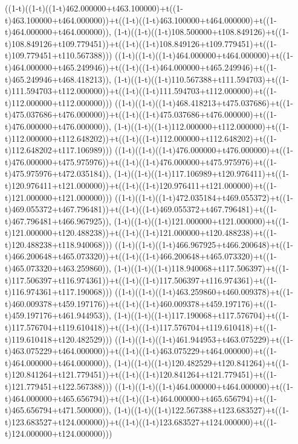 ((1-t)((1-t)((1-t)462.000000+t463.100000)+t((1-t)463.100000+t464.000000))+t((1-t)((1-t)463.100000+t464.000000)+t((1-t)464.000000+t464.000000)),                                     (1-t)((1-t)((1-t)108.500000+t108.849126)+t((1-t)108.849126+t109.779451))+t((1-t)((1-t)108.849126+t109.779451)+t((1-t)109.779451+t110.567388)))
((1-t)((1-t)((1-t)464.000000+t464.000000)+t((1-t)464.000000+t465.249946))+t((1-t)((1-t)464.000000+t465.249946)+t((1-t)465.249946+t468.418213)),                                     (1-t)((1-t)((1-t)110.567388+t111.594703)+t((1-t)111.594703+t112.000000))+t((1-t)((1-t)111.594703+t112.000000)+t((1-t)112.000000+t112.000000)))
((1-t)((1-t)((1-t)468.418213+t475.037686)+t((1-t)475.037686+t476.000000))+t((1-t)((1-t)475.037686+t476.000000)+t((1-t)476.000000+t476.000000)),                                     (1-t)((1-t)((1-t)112.000000+t112.000000)+t((1-t)112.000000+t112.648202))+t((1-t)((1-t)112.000000+t112.648202)+t((1-t)112.648202+t117.106989)))
((1-t)((1-t)((1-t)476.000000+t476.000000)+t((1-t)476.000000+t475.975976))+t((1-t)((1-t)476.000000+t475.975976)+t((1-t)475.975976+t472.035184)),                                     (1-t)((1-t)((1-t)117.106989+t120.976411)+t((1-t)120.976411+t121.000000))+t((1-t)((1-t)120.976411+t121.000000)+t((1-t)121.000000+t121.000000)))
((1-t)((1-t)((1-t)472.035184+t469.055372)+t((1-t)469.055372+t467.796481))+t((1-t)((1-t)469.055372+t467.796481)+t((1-t)467.796481+t466.967925)),                                     (1-t)((1-t)((1-t)121.000000+t121.000000)+t((1-t)121.000000+t120.488238))+t((1-t)((1-t)121.000000+t120.488238)+t((1-t)120.488238+t118.940068)))
((1-t)((1-t)((1-t)466.967925+t466.200648)+t((1-t)466.200648+t465.073320))+t((1-t)((1-t)466.200648+t465.073320)+t((1-t)465.073320+t463.259860)),                                     (1-t)((1-t)((1-t)118.940068+t117.506397)+t((1-t)117.506397+t116.974361))+t((1-t)((1-t)117.506397+t116.974361)+t((1-t)116.974361+t117.190068)))
((1-t)((1-t)((1-t)463.259860+t460.009378)+t((1-t)460.009378+t459.197176))+t((1-t)((1-t)460.009378+t459.197176)+t((1-t)459.197176+t461.944953)),                                     (1-t)((1-t)((1-t)117.190068+t117.576704)+t((1-t)117.576704+t119.610418))+t((1-t)((1-t)117.576704+t119.610418)+t((1-t)119.610418+t120.482529)))
((1-t)((1-t)((1-t)461.944953+t463.075229)+t((1-t)463.075229+t464.000000))+t((1-t)((1-t)463.075229+t464.000000)+t((1-t)464.000000+t464.000000)),                                     (1-t)((1-t)((1-t)120.482529+t120.841264)+t((1-t)120.841264+t121.779451))+t((1-t)((1-t)120.841264+t121.779451)+t((1-t)121.779451+t122.567388)))
((1-t)((1-t)((1-t)464.000000+t464.000000)+t((1-t)464.000000+t465.656794))+t((1-t)((1-t)464.000000+t465.656794)+t((1-t)465.656794+t471.500000)),                                     (1-t)((1-t)((1-t)122.567388+t123.683527)+t((1-t)123.683527+t124.000000))+t((1-t)((1-t)123.683527+t124.000000)+t((1-t)124.000000+t124.000000)))
